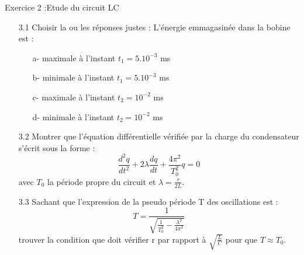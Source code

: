 \documentclass[12pt, french]{article}
\begin{document}
\begin{Box2}{Exercice 2 :Etude du circuit LC}
\begin{enumerate}
  
  \item[3.1] Choisir la ou les réponses justes :
L'énergie emmagasinée dans la bobine est :
\begin{enumerate}
  \item[a-] maximale à l'instant $t_1 = 5.10^{-3}$ ms
  \item[b-] minimale à l'instant $t_1 = 5.10^{-3}$ ms
  \item[c-] maximale à l'instant $t_2 = 10^{-2}$ ms
  \item[d-] minimale à l'instant $t_2 = 10^{-2}$ ms
\end{enumerate}

\item[3.2] Montrer que l'équation différentielle vérifiée par la charge du condensateur s'écrit sous la forme :
\[ \frac{d^2q}{dt^2} + 2\lambda\frac{dq}{dt} + \frac{4\pi^2}{T_0^2}q = 0 \]
avec $T_0$ la période propre du circuit et $\lambda = \frac{r}{2L}$.

\item[3.3] Sachant que l'expression de la pseudo période T des oscillations est :
  \[ T = \frac{1}{\sqrt{\frac{1}{T_0^2}-\frac{\lambda^2}{4\pi^2}}} \]
trouver la condition que doit vérifier r par rapport à $\sqrt{\frac{L}{C}}$ pour que $T \approx  T_0$.

\end{enumerate}
\end{Box2}
\end{document}
